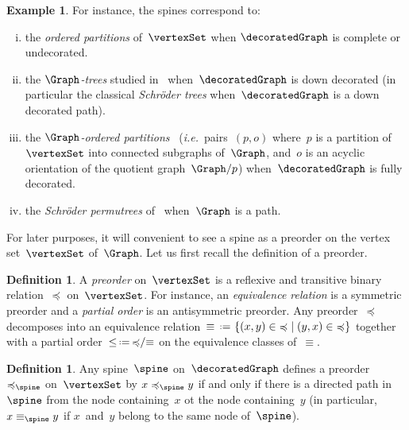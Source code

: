 \documentclass{amsart}
\theoremstyle{definition}
\newtheorem{definition}[theorem]{Definition}
\newtheorem{example}[theorem]{Example}
\newcommand{\set}[2]{\left\{ #1 \;\middle|\; #2 \right\}} %
\newcommand{\eqdef}{\mbox{\,\raisebox{0.2ex}{\scriptsize\ensuremath{\mathrm:}}\ensuremath{=}\,}} %
\newcommand{\ie}{\textit{i.e.}~} %
\newcommand{\darkblue}{\color{darkblue}} %
\newcommand{\defn}[1]{\textsl{\darkblue #1}} %
\newcommand{\vincent}[1]{\todo[color=blue!30]{#1 \\ \hfill --- V.}}
\begin{document}
\begin{example}
  \label{exm:spines}
  For instance, the spines correspond to:
  \vincent{todo: other ideas?}
  \begin{enumerate}[(i)]
    \item the \defn{ordered partitions} of~$\vertexSet$ when $\decoratedGraph$ is complete or undecorated.
    \item the \defn{$\Graph$-trees} studied in~\cite{Postnikov} when~$\decoratedGraph$ is down decorated (in particular the classical \defn{Schr\"oder trees} when~$\decoratedGraph$ is a down decorated path).
    \item the \defn{$\Graph$-ordered partitions}~\cite{Pilaud-acyclicReorientationLattices} (\ie pairs~$(p,o)$ where~$p$ is a partition of~$\vertexSet$ into connected subgraphs of~$\Graph$, and~$o$ is an acyclic orientation of the quotient graph~$\Graph/p$) when~$\decoratedGraph$ is fully decorated.
    \item the \defn{Schr\"oder permutrees} of~\cite{PilaudPons-permutrees} when~$\Graph$ is a path.
  \end{enumerate}
\end{example}

For later purposes, it will convenient to see a spine as a preorder on the vertex set~$\vertexSet$ of~$\Graph$.
Let us first recall the definition of a preorder.

\begin{definition}
  \label{def:preorder}
  A \defn{preorder} on~$\vertexSet$ is a reflexive and transitive binary relation~$\preccurlyeq$ on~$\vertexSet$.
  For instance, an \defn{equivalence relation} is a symmetric preorder and a \defn{partial order} is an antisymmetric preorder.
  Any preorder~$\preccurlyeq$ decomposes into an equivalence relation~$\equiv \eqdef \set{(x,y) \in {\preccurlyeq}}{(y,x) \in {\preccurlyeq}}$ together with a partial order~${\le} \eqdef {\preccurlyeq}/{\equiv}$ on the equivalence classes of~$\equiv$.
\end{definition}

\begin{definition}
  \label{def:spinePreorder1}
  Any spine~$\spine$ on~$\decoratedGraph$ defines a preorder~$\preccurlyeq_{\spine}$ on~$\vertexSet$ by $x \preccurlyeq_{\spine} y$ if and only if there is a directed path in~$\spine$ from the node containing~$x$ ot the node containing~$y$ (in particular, $x \equiv_{\spine} y$ if $x$~and~$y$ belong to the same node of~$\spine$).
\end{definition}
\end{document}
